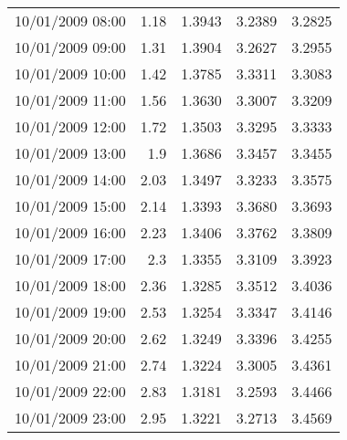 \begin{longtable}{|l|r|r|r|r|}
10/01/2009 08:00 & 1.18 & 1.3943 & 3.2389 & 3.2825 \\
10/01/2009 09:00 & 1.31 & 1.3904 & 3.2627 & 3.2955 \\
10/01/2009 10:00 & 1.42 & 1.3785 & 3.3311 & 3.3083 \\
10/01/2009 11:00 & 1.56 & 1.3630 & 3.3007 & 3.3209 \\
10/01/2009 12:00 & 1.72 & 1.3503 & 3.3295 & 3.3333 \\
10/01/2009 13:00 & 1.9 & 1.3686 & 3.3457 & 3.3455 \\
10/01/2009 14:00 & 2.03 & 1.3497 & 3.3233 & 3.3575 \\
10/01/2009 15:00 & 2.14 & 1.3393 & 3.3680 & 3.3693 \\
10/01/2009 16:00 & 2.23 & 1.3406 & 3.3762 & 3.3809 \\
10/01/2009 17:00 & 2.3 & 1.3355 & 3.3109 & 3.3923 \\
10/01/2009 18:00 & 2.36 & 1.3285 & 3.3512 & 3.4036 \\
10/01/2009 19:00 & 2.53 & 1.3254 & 3.3347 & 3.4146 \\
10/01/2009 20:00 & 2.62 & 1.3249 & 3.3396 & 3.4255 \\
10/01/2009 21:00 & 2.74 & 1.3224 & 3.3005 & 3.4361 \\
10/01/2009 22:00 & 2.83 & 1.3181 & 3.2593 & 3.4466 \\
10/01/2009 23:00 & 2.95 & 1.3221 & 3.2713 & 3.4569 \\

\end{longtable}

